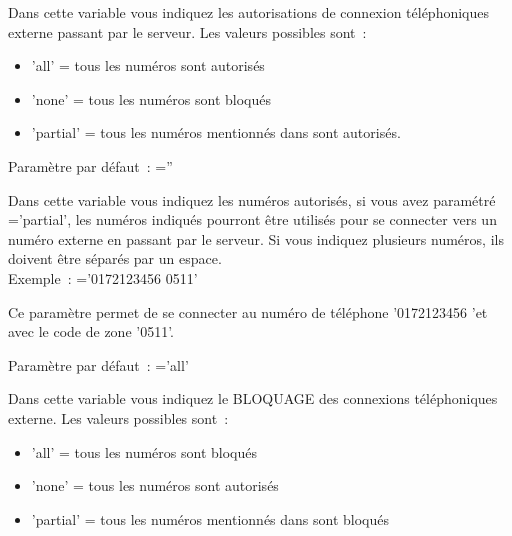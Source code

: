 \begin{description}
        Dans cette variable vous indiquez les autorisations de connexion téléphoniques
		externe passant par le serveur.
		Les valeurs possibles sont~:
        \begin{itemize}
            \item 'all' = tous les numéros sont autorisés
            \item 'none' = tous les numéros sont bloqués
            \item 'partial' = tous les numéros mentionnés dans
                sont autorisés.
        \end{itemize}


        Paramètre par défaut~: =''

        Dans cette variable vous indiquez les numéros autorisés, si vous avez paramétré
		='partial', les numéros indiqués pourront
		être utilisés pour se connecter vers un numéro externe en passant par le serveur.
		Si vous indiquez plusieurs numéros, ils doivent être séparés par un espace. \\
		Exemple~: ='0172123456 0511'
		
		Ce paramètre permet de se connecter au numéro de téléphone '0172123456 'et avec
		le code de zone '0511'.


        Paramètre par défaut~: ='all'

        Dans cette variable vous indiquez le BLOQUAGE des connexions téléphoniques externe.
		Les valeurs possibles sont~:
        \begin{itemize}
            \item 'all' = tous les numéros sont bloqués 
            \item 'none' = tous les numéros sont autorisés
            \item 'partial' = tous les numéros mentionnés dans
                sont bloqués
        \end{itemize}


\end{description}
